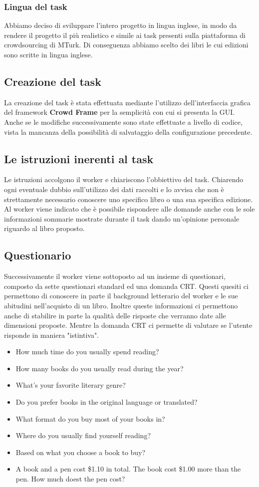 \documentclass[a4paper,11pt]{report}
\begin{document}
\subsubsection{Lingua del task}
Abbiamo deciso di sviluppare l'intero progetto in lingua inglese, in modo da rendere il progetto il più realistico e simile ai task presenti sulla piattaforma di crowdsourcing di MTurk. Di conseguenza abbiamo scelto dei libri le cui edizioni sono scritte in lingua inglese.

\subsection{Creazione del task}
La creazione del task è stata effettuata mediante l'utilizzo dell'interfaccia grafica del framework \textbf{Crowd Frame} per la semplicità con cui si presenta la GUI. Anche se le modifiche successivamente sono state effettuate a livello di codice, vista la mancanza della possibilità di salvataggio della configurazione precedente.

\subsection{Le istruzioni inerenti al task}
Le istruzioni accolgono il worker e chiariscono l'obbiettivo del task. Chiarendo ogni eventuale dubbio sull'utilizzo dei dati raccolti e lo avvisa che non è strettamente necessario conoscere uno specifico libro o una sua specifica edizione. Al worker viene indicato che è possibile rispondere alle domande anche con le sole informazioni sommarie mostrate durante il task dando un'opinione personale riguardo al libro proposto.
\pagebreak
\subsection{Questionario}
Successivamente il worker viene sottoposto ad un insieme di questionari, composto da sette questionari standard ed una domanda CRT.
Questi quesiti ci permettono di conoscere in parte il background letterario del worker e le sue abitudini nell'acquisto di un libro.
Inoltre queste informazioni ci permettono anche di stabilire in parte la qualità delle risposte che verranno date alle dimensioni proposte.
Mentre la domanda CRT ci permette di valutare se l'utente risponde in maniera "istintiva".
\begin{itemize}
	\item How much time do you usually spend reading?
	\item How many books do you usually read during the year?
	\item What's your favorite literary genre?
	\item Do you prefer books in the original language or translated?
	\item What format do you buy most of your books in?
	\item Where do you usually find yourself reading?
	\item Based on what you choose a book to buy?
	\item A book and a pen cost \$1.10 in total. The book cost \$1.00 more than the pen. How much doest the pen cost?
\end{itemize}
\end{document}
